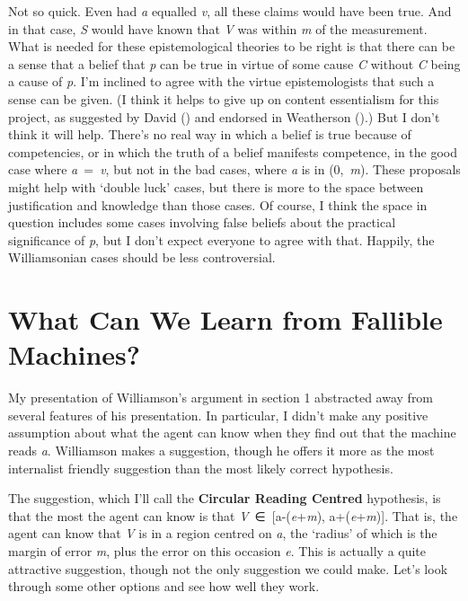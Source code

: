 \documentclass[
  11pt,
  letterpaper,
  DIV=11,
  numbers=noendperiod,
  twoside]{scrartcl}
\begin{document}
Not so quick. Even had \emph{a} equalled \emph{v}, all these claims
would have been true. And in that case, \emph{S} would have known that
\emph{V} was within \emph{m} of the measurement. What is needed for
these epistemological theories to be right is that there can be a sense
that a belief that \emph{p} can be true in virtue of some cause \emph{C}
without \emph{C} being a cause of \emph{p}. I'm inclined to agree with
the virtue epistemologists that such a sense can be given. (I think it
helps to give up on content essentialism for this project, as suggested
by David () and endorsed in Weatherson
().) But I don't think it will
help. There's no real way in which a belief is true because of
competencies, or in which the truth of a belief manifests competence, in
the good case where \emph{a}~=~\emph{v}, but not in the bad cases, where
\emph{a} is in (0,~\emph{m}). These proposals might help with `double
luck' cases, but there is more to the space between justification and
knowledge than those cases. Of course, I think the space in question
includes some cases involving false beliefs about the practical
significance of \emph{p}, but I don't expect everyone to agree with
that. Happily, the Williamsonian cases should be less controversial.

\section{What Can We Learn from Fallible
Machines?}\label{what-can-we-learn-from-fallible-machines}

My presentation of Williamson's argument in section 1 abstracted away
from several features of his presentation. In particular, I didn't make
any positive assumption about what the agent can know when they find out
that the machine reads \emph{a}. Williamson makes a suggestion, though
he offers it more as the most internalist friendly suggestion than the
most likely correct hypothesis.

The suggestion, which I'll call the \textbf{Circular Reading Centred}
hypothesis, is that the most the agent can know is that
\emph{V}~∈~{[}a-(\emph{e}+\emph{m}), a+(\emph{e}+\emph{m}){]}. That is,
the agent can know that \emph{V} is in a region centred on \emph{a}, the
`radius' of which is the margin of error \emph{m}, plus the error on
this occasion \emph{e}. This is actually a quite attractive suggestion,
though not the only suggestion we could make. Let's look through some
other options and see how well they work.
\end{document}
